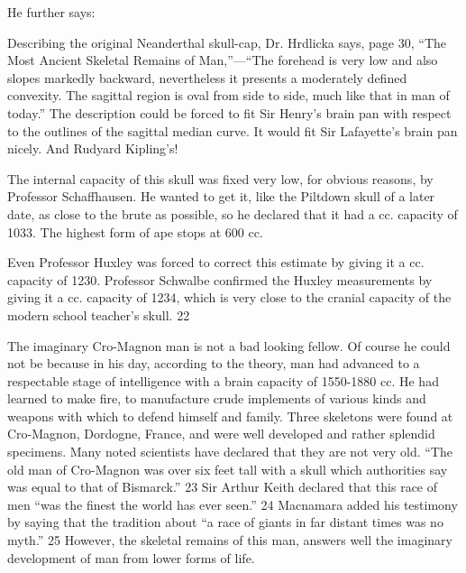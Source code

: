 He further says:

Describing the original Neanderthal skull-cap, Dr. Hrdlicka says, page 30, ``The Most
Ancient Skeletal Remains of Man,''—``The forehead is very low and also slopes markedly
backward, nevertheless it presents a moderately defined convexity. The sagittal region is oval
from side to side, much like that in man of today.'' The description could be forced to fit Sir
Henry's brain pan with respect to the outlines of the sagittal median curve. It would fit Sir
Lafayette's brain pan nicely. And Rudyard Kipling's!

The internal capacity of this skull was fixed very low, for obvious reasons, by Professor
Schaffhausen. He wanted to get it, like the Piltdown skull of a later date, as close to the brute
as possible, so he declared that it had a cc. capacity of 1033. The highest form of ape stops at
600 cc.

Even Professor Huxley was forced to correct this estimate by giving it a cc. capacity of 1230.
Professor Schwalbe confirmed the Huxley measurements by giving it a cc. capacity of 1234,
which is very close to the cranial capacity of the modern school teacher's skull. 22

The imaginary Cro-Magnon man is not a bad looking fellow. Of course he could not be
because in his day, according to the theory, man had advanced to a respectable stage of
intelligence with a brain capacity of 1550-1880 cc. He had learned to make fire, to
manufacture crude implements of various kinds and weapons with which to defend himself
and family. Three skeletons were found at Cro-Magnon, Dordogne, France, and were well
developed and rather splendid specimens. Many noted scientists have declared that they are
not very old. ``The old man of Cro-Magnon was over six feet tall with a skull which
authorities say was equal to that of Bismarck.'' 23 Sir Arthur Keith declared that this race of
men ``was the finest the world has ever seen.'' 24 Macnamara added his testimony by saying
that the tradition about ``a race of giants in far distant times was no myth.'' 25 However, the
skeletal remains of this man, answers well the imaginary development of man from lower
forms of life.


